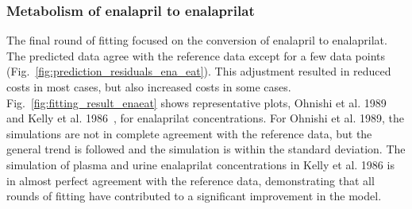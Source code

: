 \subsubsection{Metabolism of enalapril to enalaprilat}


The final round of fitting focused on the conversion of enalapril to enalaprilat. The predicted data agree with the reference data except for a few data points (Fig.~\ref{fig:prediction_residuals_ena_eat}). This adjustment resulted in reduced costs in most cases, but also increased costs in some cases. Fig.~\ref{fig:fitting_result_enaeat} shows representative plots, Ohnishi et al. 1989~\cite{Ohnishi1989} and Kelly et al. 1986~\cite{Kelly1986}, for enalaprilat concentrations. For Ohnishi et al. 1989, the simulations are not in complete agreement with the reference data, but the general trend is followed and the simulation is within the standard deviation. The simulation of plasma and urine enalaprilat concentrations in Kelly et al. 1986 is in almost perfect agreement with the reference data, demonstrating that all rounds of fitting have contributed to a significant improvement in the model. 


